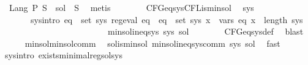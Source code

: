 \begin{isabellebody}
\ {\isacharasterisk}{\kern0pt}{\isacharasterisk}{\kern0pt}{\isacharasterisk}{\kern0pt}{\isacharcolon}{\kern0pt}\ {\isachardoublequoteopen}Lang\ P\ S\ {\isacharequal}{\kern0pt}\ {\isacharquery}{\kern0pt}sol\ {\isacharparenleft}{\kern0pt}{\isasymgamma}{\isacharprime}{\kern0pt}\ S{\isacharparenright}{\kern0pt}{\isachardoublequoteclose}\ \isamarkupfalse%
\ metis\isanewline
\isanewline
\ \ \ \ \isamarkupfalse%
\ {\isacharasterisk}{\kern0pt}\ {\isacharasterisk}{\kern0pt}{\isacharasterisk}{\kern0pt}\ CFG{\isacharunderscore}{\kern0pt}eq{\isacharunderscore}{\kern0pt}sys{\isachardot}{\kern0pt}CFL{\isacharunderscore}{\kern0pt}is{\isacharunderscore}{\kern0pt}min{\isacharunderscore}{\kern0pt}sol\ \isamarkupfalse%
\ sys\isanewline
\ \ \ \ \ \ \ sys{\isacharunderscore}{\kern0pt}intro{\isacharcolon}{\kern0pt}\ {\isachardoublequoteopen}{\isacharparenleft}{\kern0pt}{\isasymforall}eq\ {\isasymin}\ set\ sys{\isachardot}{\kern0pt}\ reg{\isacharunderscore}{\kern0pt}eval\ eq{\isacharparenright}{\kern0pt}\ {\isasymand}\ {\isacharparenleft}{\kern0pt}{\isasymforall}eq\ {\isasymin}\ set\ sys{\isachardot}{\kern0pt}\ {\isasymforall}x\ {\isasymin}\ vars\ eq{\isachardot}{\kern0pt}\ x\ {\isacharless}{\kern0pt}\ length\ sys{\isacharparenright}{\kern0pt}\isanewline
\ \ \ \ \ \ \ \ \ \ \ \ \ \ \ \ \ \ \ \ \ \ \ \ {\isasymand}\ min{\isacharunderscore}{\kern0pt}sol{\isacharunderscore}{\kern0pt}ineq{\isacharunderscore}{\kern0pt}sys\ sys\ {\isacharquery}{\kern0pt}sol{\isachardoublequoteclose}\isanewline
\ \ \ \ \ \ \isamarkupfalse%
\ CFG{\isacharunderscore}{\kern0pt}eq{\isacharunderscore}{\kern0pt}sys{\isacharunderscore}{\kern0pt}def\ \isamarkupfalse%
\ blast\isanewline
\ \ \ \ \isamarkupfalse%
\ min{\isacharunderscore}{\kern0pt}sol{\isacharunderscore}{\kern0pt}min{\isacharunderscore}{\kern0pt}sol{\isacharunderscore}{\kern0pt}comm\ \isamarkupfalse%
\ sol{\isacharunderscore}{\kern0pt}is{\isacharunderscore}{\kern0pt}min{\isacharunderscore}{\kern0pt}sol{\isacharcolon}{\kern0pt}\ {\isachardoublequoteopen}min{\isacharunderscore}{\kern0pt}sol{\isacharunderscore}{\kern0pt}ineq{\isacharunderscore}{\kern0pt}sys{\isacharunderscore}{\kern0pt}comm\ sys\ {\isacharquery}{\kern0pt}sol{\isachardoublequoteclose}\ \isamarkupfalse%
\ fast\isanewline
\ \ \ \ \isamarkupfalse%
\ sys{\isacharunderscore}{\kern0pt}intro\ exists{\isacharunderscore}{\kern0pt}minimal{\isacharunderscore}{\kern0pt}reg{\isacharunderscore}{\kern0pt}sol{\isacharunderscore}{\kern0pt}sys\ \isamarkupfalse%

\end{isabellebody}
